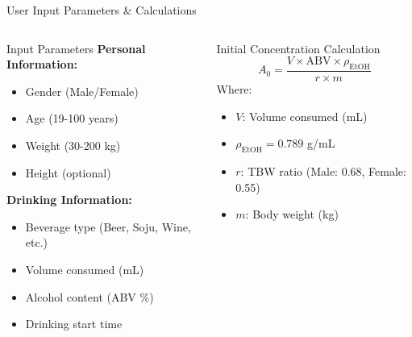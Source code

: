 \documentclass[aspectratio=169,14pt]{beamer}
\begin{document}
\begin{frame}{User Input Parameters \& Calculations}
    \begin{columns}
        \begin{column}{0.5\textwidth}
            \begin{block}{Input Parameters}
                \textbf{Personal Information:}
                \begin{itemize}
                    \item Gender (Male/Female)
                    \item Age (19-100 years)
                    \item Weight (30-200 kg)
                    \item Height (optional)
                \end{itemize}
                
                \textbf{Drinking Information:}
                \begin{itemize}
                    \item Beverage type (Beer, Soju, Wine, etc.)
                    \item Volume consumed (mL)
                    \item Alcohol content (ABV \%)
                    \item Drinking start time
                \end{itemize}
            \end{block}
        \end{column}
        
        \begin{column}{0.5\textwidth}
            \begin{block}{Initial Concentration Calculation}
                \[
                A_0 = \frac{V \times \text{ABV} \times \rho_{\text{EtOH}}}{r \times m}
                \]
                Where:
                \begin{itemize}
                    \item $V$: Volume consumed (mL)
                    \item $\rho_{\text{EtOH}} = 0.789$ g/mL
                    \item $r$: TBW ratio (Male: 0.68, Female: 0.55)
                    \item $m$: Body weight (kg)
                \end{itemize}
            \end{block}
            

\end{column}
\end{columns}
\end{frame}
\end{document}
